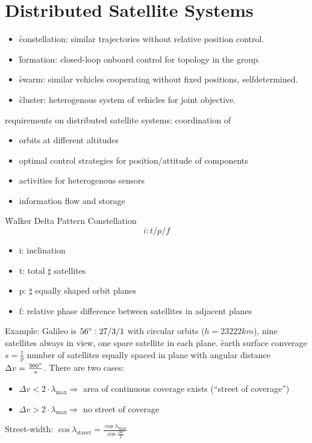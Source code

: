 \section{Distributed Satellite Systems}
\begin{itemize}
 \item \f{constellation}: similar trajectories without relative position control.
 \item \f{formation}: closed-loop onboard control for topology in the group.
 \item \f{swarm}: similar vehicles cooperating without fixed positions, selfdetermined.
 \item \f{cluster}: heterogenous system of vehicles for joint objective.
\end{itemize}
requirements on distributed satellite systems: coordination of
\begin{itemize}
 \item orbits at different altitudes
 \item optimal control strategies for position/attitude of components
 \item activities for heterogenous sensors
 \item information flow and storage
\end{itemize}
\f{Walker Delta Pattern Constellation}
\[ i: t/p/f \]
\begin{itemize}
 \item i: inclination
 \item t: total $\sharp$ satellites
 \item p: $\sharp$ equally shaped orbit planes
 \item f: relative phase difference between satellites in adjacent planes
\end{itemize}
Example: Galileo is $56\degree: 27/3/1$ with circular orbits ($h =23222km$), nine satellites always in view, one spare satellite in each plane.
\f{earth surface converage}
$ s = \frac{t}{p}$ number of satellites equally spaced in plane with angular distance $\Delta v = \frac{360\degree}{s}$. There are two cases:
\begin{itemize}
 \item $\Delta v < 2\cdot \lambda_\text{max} \Rightarrow$ area of continuous coverage exists (``street of coverage'')
 \item $\Delta v > 2\cdot \lambda_\text{max} \Rightarrow$ no street of coverage
\end{itemize}
Street-width: $\cos \lambda_\text{street} = \frac{\cos\lambda_\text{max}}{\cos\frac{\Delta v}{2}}$

